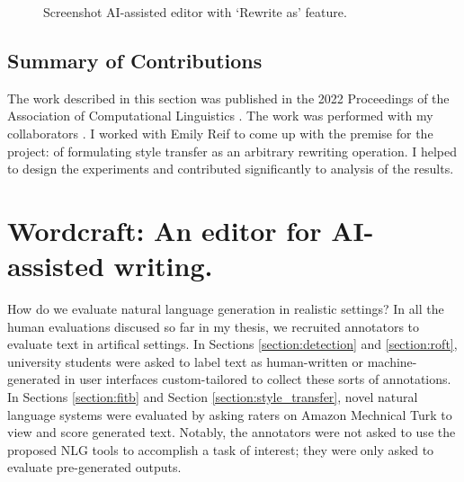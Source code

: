 \begin{figure}[!htb]
  \centering
  \caption{Screenshot AI-assisted editor with `Rewrite as' feature.\label{fig:wc}}
  \vspace{-0.1cm}
\end{figure} 

\subsection{Summary of Contributions}
The work described in this section was published in the 2022 Proceedings of the Association of Computational Linguistics .
The work was performed with my collaborators .
I worked with Emily Reif to come up with the premise for the project: of formulating style transfer as an arbitrary rewriting operation.
I helped to design the experiments and contributed significantly to analysis of the results.


\section{Wordcraft: An editor for AI-assisted writing.}
\label{section:wordcraft}

How do we evaluate natural language generation in realistic settings? In all the human evaluations discused so far in my thesis, we recruited annotators to evaluate text in artifical settings. In Sections \ref{section:detection} and \ref{section:roft}, university students were asked to label text as human-written or machine-generated in user interfaces custom-tailored to collect these sorts of annotations. In Sections \ref{section:fitb} and Section \ref{section:style_transfer}, novel natural language systems were evaluated by asking raters on Amazon Mechnical Turk to view and score generated text.
Notably, the annotators were not asked to use the proposed NLG tools to accomplish a task of interest; they were only asked to evaluate pre-generated outputs.

